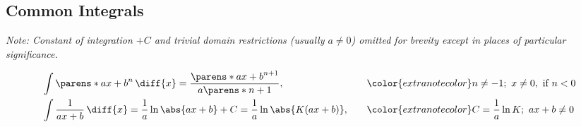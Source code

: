 \subsection{Common Integrals}%
\label{sub:common-integrals}

{\color{extranotecolor} \textit{Note: Constant of integration $+C$ and trivial domain restrictions (usually $a \ne 0$) omitted for brevity except in places of particular significance.} }

\vspace*{-\parskip} 
\vspace*{-\abovedisplayskip}

%
\begin{HackEquationLeftAlign}
\begin{alignat*}{2}
    &\int{\parens*{ax + b}^n \,\diff{x}} = \frac{\parens*{ax + b}^{n+1}}{a \parens*{n+1}}
        ,\quad
        &&{\color{extranotecolor}
            n \neq -1
            ;\ x \neq 0
            ,\ \text{if } n < 0
        }
        \\
    &\int{\frac{1}{ax + b} \,\diff{x}} = \frac{1}{a} \ln{\abs{ax + b}} + C
        = \frac{1}{a} \ln{\abs{K(ax + b)}}
        ,\quad
        &&{\color{extranotecolor}
            C = \frac{1}{a} \ln{K}
            ;\ ax + b \ne 0
        }
\end{alignat*}
\end{HackEquationLeftAlign}%


